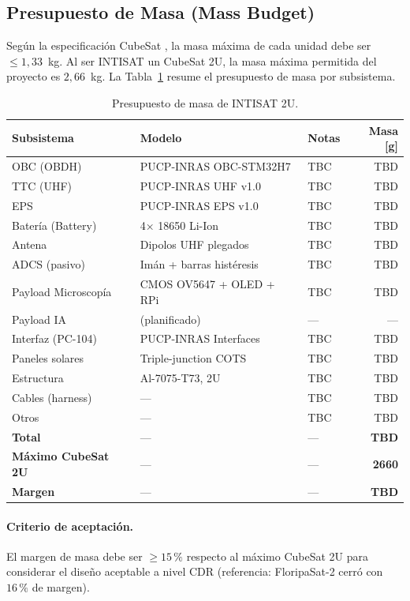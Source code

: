 
\subsection{Presupuesto de Masa (Mass Budget)}

Según la especificación CubeSat \cite{CDS_Rev14}, la masa máxima de cada unidad debe ser
$\le 1{,}33$~kg. Al ser INTISAT un CubeSat 2U, la masa máxima permitida del proyecto es
$2{,}66$~kg. La Tabla~\ref{tab:mass_budget} resume el presupuesto de masa por subsistema.

\begin{table}[h]
\centering
\caption{Presupuesto de masa de INTISAT 2U.}
\label{tab:mass_budget}
\begin{tabular}{lll@{}r}
\toprule
\textbf{Subsistema} & \textbf{Modelo} & \textbf{Notas} & \textbf{Masa [g]} \\
\midrule
OBC (OBDH)          & PUCP-INRAS OBC-STM32H7 & TBC & TBD \\
TTC (UHF)           & PUCP-INRAS UHF v1.0     & TBC & TBD \\
EPS                 & PUCP-INRAS EPS v1.0     & TBC & TBD \\
Batería (Battery)   & 4× 18650 Li-Ion         & TBC & TBD \\
Antena              & Dipolos UHF plegados    & TBC & TBD \\
ADCS (pasivo)       & Imán + barras histéresis & TBC & TBD \\
Payload Microscopía & CMOS OV5647 + OLED + RPi & TBC & TBD \\
Payload IA          & (planificado)           & --- & --- \\
Interfaz (PC-104)   & PUCP-INRAS Interfaces   & TBC & TBD \\
Paneles solares     & Triple-junction COTS    & TBC & TBD \\
Estructura          & Al-7075-T73, 2U         & TBC & TBD \\
Cables (harness)    & ---                     & TBC & TBD \\
Otros               & ---                     & TBC & TBD \\
\midrule
\textbf{Total}                  & --- & --- & \textbf{TBD} \\
\textbf{Máximo CubeSat 2U}      & --- & --- & \textbf{2660} \\
\textbf{Margen}                 & --- & --- & \textbf{TBD} \\
\bottomrule
\end{tabular}
\end{table}

\paragraph{Criterio de aceptación.} El margen de masa debe ser
$\ge 15\,\%$ respecto al máximo CubeSat 2U para considerar el diseño aceptable a
nivel CDR (referencia: FloripaSat-2 cerró con $16\,\%$ de margen).
